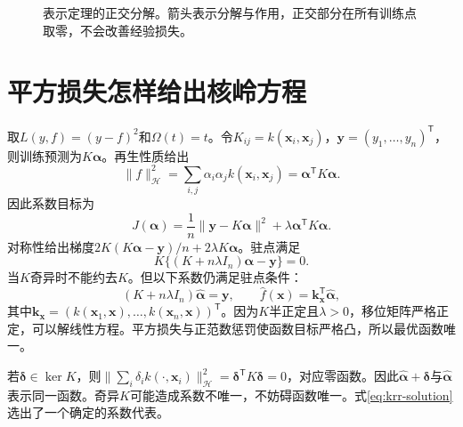 \begin{figure}[htbp]
\centering
{}
\caption{表示定理的正交分解。箭头表示分解与作用，正交部分在所有训练点取零，不会改善经验损失。}
\label{fig:krr-representer-decomposition}
\end{figure}

\section{平方损失怎样给出核岭方程}
取$L(y,f)=(y-f)^2$和$\Omega(t)=t$。令$K_{ij}=k(\bm x_i,\bm x_j)$，$\bm y=(y_1,\ldots,y_n)^{\mathsf T}$，则训练预测为$K\bm\alpha$。再生性质给出
\begin{equation}
 \|f\|_{\mathcal H}^2
 =\sum_{i,j}\alpha_i\alpha_jk(\bm x_i,\bm x_j)
 =\bm\alpha^{\mathsf T}K\bm\alpha.
\end{equation}
因此系数目标为
\begin{equation}
 J(\bm\alpha)=\frac1n\|\bm y-K\bm\alpha\|^2
 +\lambda\bm\alpha^{\mathsf T}K\bm\alpha.
 \label{eq:krr-coefficient-objective}
\end{equation}
对称性给出梯度$2K(K\bm\alpha-\bm y)/n+2\lambda K\bm\alpha$。驻点满足
\begin{equation}
 K\{(K+n\lambda I_n)\bm\alpha-\bm y\}=0.
\end{equation}
当$K$奇异时不能约去$K$。但以下系数仍满足驻点条件：
\begin{equation}
 (K+n\lambda I_n)\hat{\bm\alpha}=\bm y,
 \qquad \hat f(\bm x)=\bm k_{\bm x}^{\mathsf T}\hat{\bm\alpha},
 \label{eq:krr-solution}
\end{equation}
其中$\bm k_{\bm x}=(k(\bm x_1,\bm x),\ldots,k(\bm x_n,\bm x))^{\mathsf T}$。因为$K$半正定且$\lambda>0$，移位矩阵严格正定，可以解线性方程。平方损失与正范数惩罚使函数目标严格凸，所以最优函数唯一。

若$\bm\delta\in\ker K$，则$\|\sum_i\delta_i k(\cdot,\bm x_i)\|_{\mathcal H}^2=\bm\delta^{\mathsf T}K\bm\delta=0$，对应零函数。因此$\hat{\bm\alpha}+\bm\delta$与$\hat{\bm\alpha}$表示同一函数。奇异$K$可能造成系数不唯一，不妨碍函数唯一。式\eqref{eq:krr-solution}选出了一个确定的系数代表。

